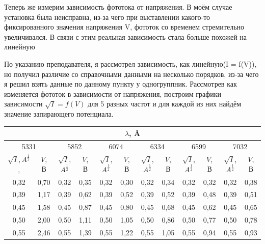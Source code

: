 \documentclass[a4paper,12pt]{article}
\begin{document}
Теперь же измерим зависимость фототока от напряжения. В моём случае установка была неисправна, из-за чего при выставлении какого-то фиксированного значения напряжения V, фототок со временем стремительно увеличивался. В связи с этим реальная зависимость стала больше похожей на линейную

По указанию преподавателя, я рассмотрел зависимость, как линейную(I = f(V)), но получил различие со справочными данными на несколько порядков, из-за чего я решил взять данные по данному пункту у одногруппник. Рассмотрев как изменяется фототок в зависимости от напряжения, построим графики зависимости $\sqrt{I} = f(V)$ для 5 разных частот и для каждой из них найдём значение запирающего потенциала.

\vspace{5mm}
\begin{table}[H]

\begin{tabular}{|c|c|c|c|c|c|c|c|c|c|c|c|}
\hline
\multicolumn{12}{|c|}{$\lambda$, \AA} \\
\hline
\multicolumn{2}{|c|}{5331} & \multicolumn{2}{|c|}{5852} & \multicolumn{2}{|c|}{6074} & \multicolumn{2}{|c|}{6334} & \multicolumn{2}{|c|}{6599} & \multicolumn{2}{|c|}{7032} \\
\hline
$\sqrt{I}, A^\frac{1}{2}$,  & $V$, В & $\sqrt{I}$, $A^\frac{1}{2}$ & $V$, В & $\sqrt{I}$, $A^\frac{1}{2}$ & $V$, В & $\sqrt{I}$, $A^\frac{1}{2}$ & $V$, В & $\sqrt{I}$, $A^\frac{1}{2}$ & $V$, В & $\sqrt{I}$, $A^\frac{1}{2}$ & $V$, В \\
\hline
0,32 & 0,70 & 0,32 & 0,35 & 0,32 & 0,30 & 0,32 & 0,34 & 0,32 & 0,32 & 0,32 & 0,38 \\
\hline
0,39 & 1,17 & 0,39 & 0,62 & 0,39 & 0,52 & 0,39 & 0,52 & 0,39 & 0,48 & 0,39 & 0,51 \\
\hline
0,45 & 1,58 & 0,45 & 0,87 & 0,45 & 0,80 & 0,45 & 0,68 & 0,45 & 0,62 & 0,45 & 0,65 \\
\hline
0,50 & 2,00 & 0,50 & 1,11 & 0,50 & 1,05 & 0,50 & 0,86 & 0,50 & 0,77 & 0,50 & 0,78 \\
\hline
0,55 & 2,46 & 0,55 & 1,39 & 0,55 & 1,22 & 0,55 & 1,05 & 0,55 & 0,94 & 0,55 & 0,93 \\
\hline

\end{tabular}
\end{table}
\end{document}
